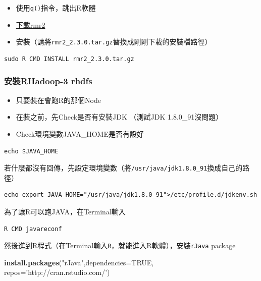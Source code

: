 \documentclass[]{book}
\newenvironment{Shaded}{\begin{snugshade}}{\end{snugshade}}
\newcommand{\KeywordTok}[1]{\textcolor[rgb]{0.13,0.29,0.53}{\textbf{{#1}}}}
\newcommand{\DataTypeTok}[1]{\textcolor[rgb]{0.13,0.29,0.53}{{#1}}}
\newcommand{\StringTok}[1]{\textcolor[rgb]{0.31,0.60,0.02}{{#1}}}
\newcommand{\OtherTok}[1]{\textcolor[rgb]{0.56,0.35,0.01}{{#1}}}
\newcommand{\NormalTok}[1]{{#1}}
\providecommand{\tightlist}{%
  \setlength{\itemsep}{0pt}\setlength{\parskip}{0pt}}
\theoremstyle{definition}
\theoremstyle{definition}
\theoremstyle{remark}
\begin{document}
\begin{itemize}
\tightlist
\item
  使用\texttt{q()}指令，跳出R軟體
\item
  \href{https://github.com/RevolutionAnalytics/RHadoop/wiki/Downloads}{下載rmr2}
\item
  安裝（請將\texttt{rmr2\_2.3.0.tar.gz}替換成剛剛下載的安裝檔路徑）
\end{itemize}

\begin{verbatim}
sudo R CMD INSTALL rmr2_2.3.0.tar.gz
\end{verbatim}

\subsubsection{安裝RHadoop-3 rhdfs}\label{rhadoop-3-rhdfs}

\begin{itemize}
\tightlist
\item
  只要裝在會跑R的那個Node
\item
  在裝之前，先Check是否有安裝JDK （測試JDK 1.8.0\_91沒問題）
\item
  Check環境變數JAVA\_HOME是否有設好
\end{itemize}

\begin{verbatim}
echo $JAVA_HOME
\end{verbatim}

若什麼都沒有回傳，先設定環境變數（將\texttt{/usr/java/jdk1.8.0\_91}換成自己的路徑）

\begin{verbatim}
echo export JAVA_HOME="/usr/java/jdk1.8.0_91">/etc/profile.d/jdkenv.sh
\end{verbatim}

為了讓R可以跑JAVA，在Terminal輸入

\begin{verbatim}
R CMD javareconf
\end{verbatim}

然後進到R程式（在Terminal輸入\texttt{R}，就能進入R軟體），安裝\texttt{rJava}
package

\begin{Shaded}
\begin{Highlighting}[]
\KeywordTok{install.packages}\NormalTok{(}\StringTok{"rJava"}\NormalTok{,}\DataTypeTok{dependencies=}\OtherTok{TRUE}\NormalTok{, }\DataTypeTok{repos=}\StringTok{'http://cran.rstudio.com/'}\NormalTok{)}
\end{Highlighting}
\end{Shaded}
\end{document}
